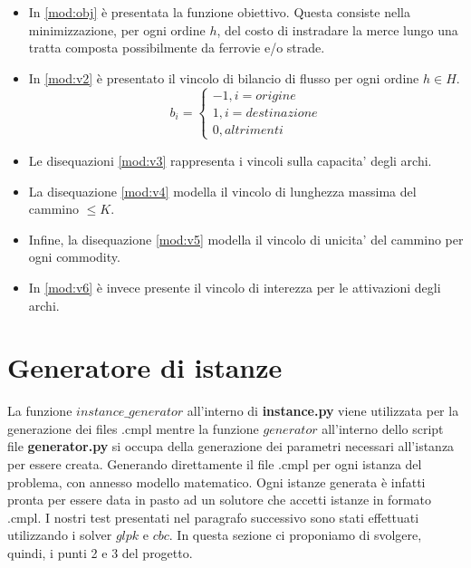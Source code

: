 \documentclass{article}
\begin{document}
\begin{itemize}


    \item In \eqref{mod:obj} è presentata la funzione obiettivo. Questa consiste nella minimizzazione, per ogni ordine $h$, del costo di instradare la merce lungo una tratta composta possibilmente da ferrovie e/o strade.
    
    \item In \eqref{mod:v2} è presentato il vincolo di bilancio di flusso per ogni ordine $h \in H$.
    \begin{equation*}
    b_i =
    \begin{cases}
      -1, i = origine \\
      1, i = destinazione \\
      0, altrimenti
    \end{cases}
    \end{equation*}

    \item Le disequazioni \eqref{mod:v3} rappresenta i vincoli sulla capacita' degli archi.
    \item La disequazione \eqref{mod:v4} modella il vincolo di lunghezza massima del cammino $\leq K$.
    \item Infine, la disequazione \eqref{mod:v5} modella il vincolo di unicita' del cammino per ogni commodity.
    \item In \eqref{mod:v6} \`e invece presente il vincolo di interezza per le attivazioni degli archi.

\end{itemize}


\section{Generatore di istanze}
La funzione $instance\_generator$ all'interno di \textbf{instance.py} viene utilizzata per la generazione dei files .cmpl mentre la funzione $generator$ all'interno dello script file \textbf{generator.py} si occupa della generazione dei parametri necessari all'istanza per essere creata. Generando direttamente il file .cmpl per ogni istanza del problema, con annesso modello matematico. Ogni istanze generata è infatti pronta per essere data in pasto ad un solutore che accetti istanze in formato .cmpl. I nostri test presentati nel paragrafo successivo sono stati effettuati utilizzando i solver $glpk$ e $cbc$. In questa sezione ci proponiamo di svolgere, quindi, i punti 2 e 3 del progetto.
\end{document}
